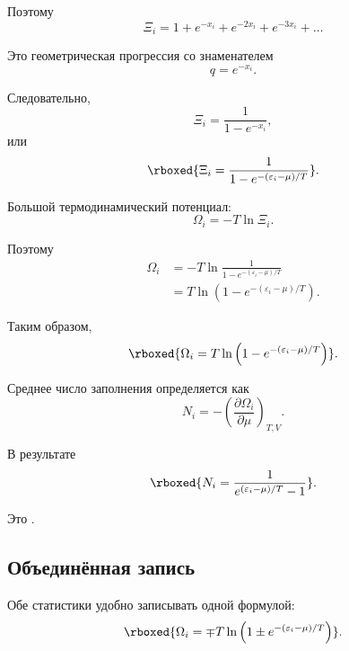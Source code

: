 \documentclass[../final.tex]{subfiles}
\begin{document}
Поэтому
%
\begin{equation*}
    \Xi_i
    =
    1
    +
    e^{-x_i}
    +
    e^{-2x_i}
    +
    e^{-3x_i}
    +
    \ldots
\end{equation*}

Это геометрическая прогрессия со знаменателем
%
\begin{equation*}
    q
    =
    e^{-x_i}.
\end{equation*}

Следовательно,
%
\begin{equation*}
    \Xi_i
    =
    \frac{1}{
        1-e^{-x_i}
    },
\end{equation*}
%
или
%
\[
    \rboxed{
        \Xi_i
        =
        \frac{1}{
            1-e^{-(\varepsilon_i-\mu)/T}
        }
    }.
\]

Большой термодинамический потенциал:
%
\begin{equation*}
    \Omega_i
    =
    -T\ln\Xi_i.
\end{equation*}

Поэтому
%
\begin{align*}
    \Omega_i
    &=
    -T
    \ln
    \frac{1}{
        1-e^{-(\varepsilon_i-\mu)/T}
    }
    \\[4pt]
    &=
    T
    \ln
    \left(
        1-e^{-(\varepsilon_i-\mu)/T}
    \right).
\end{align*}

Таким образом,
%
\[
    \rboxed{
        \Omega_i
        =
        T
        \ln
        \left(
            1-e^{-(\varepsilon_i-\mu)/T}
        \right)
    }.
\]

Среднее число заполнения определяется как
%
\begin{equation*}
    N_i
    =
    -
    \left(
        \frac{\partial\Omega_i}{\partial\mu}
    \right)_{T,V}.
\end{equation*}

В результате
%
\[
    \rboxed{
        N_i
        =
        \frac{1}{
            e^{(\varepsilon_i-\mu)/T}-1
        }
    }.
\]

Это .


\subsection{Объединённая запись}

Обе статистики удобно записывать одной формулой:
%
\[
    \rboxed{
        \Omega_i
        =
        \mp T
        \ln
        \left(
            1
            \pm
            e^{-(\varepsilon_i-\mu)/T}
        \right)
    }.
\]
\end{document}
